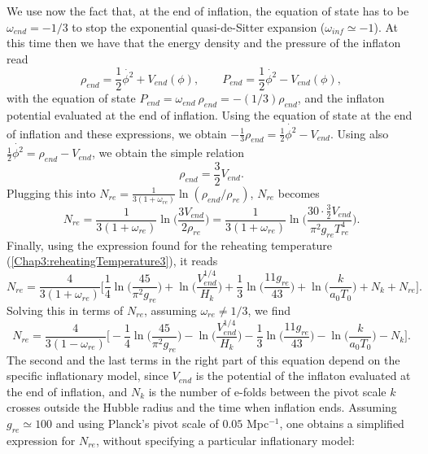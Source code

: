 \documentclass[11pt,a4paper,twoside]{book}
\begin{document}
We use now the fact that, at the end of inflation, the equation of state has to be $ \omega_{end}=-1/3 $ to stop the exponential quasi-de-Sitter expansion ($\omega_{inf} \simeq -1$). At this time then we have that the energy density and the pressure of the inflaton read
\begin{equation}
	\rho_{end} = \frac{1}{2}\dot{\phi^{2}} + V_{end}(\phi),
	\qquad
	P_{end}=  \frac{1}{2}\dot{\phi^{2}} - V_{end}(\phi),
\end{equation}
with the equation of state $ P_{end}=\omega_{end}\ \rho_{end}=-(1/3)\rho_{end} $, and the inflaton potential evaluated at the end of inflation. Using the equation of state at the end of inflation and  these expressions, we obtain 
$ -\frac{1}{3}\rho_{end}= \frac{1}{2}\dot{\phi^{2}}-V_{end} $. Using also $ \frac{1}{2}\dot{\phi^{2}}=\rho_{end}-V_{end} $, we obtain the simple relation 
\begin{equation}
	\label{Chap3:energyDensityPressure}
	\rho_{end}=\frac{3}{2}V_{end}.
\end{equation}
Plugging this into $ N_{re}=\frac{1}{3(1+\omega_{re})}\ln(\rho_{end}/\rho_{re})$, $ N_{re} $ becomes
\begin{equation}
\label{Chap3:Nre2}
N_{re}=\dfrac{1}{3(1+\omega_{re})}\ln \Bigg(\frac{3 V_{end}}{2\rho_{re}} \Bigg) = \dfrac{1}{3(1+\omega_{re})}\ln \Bigg( \frac{30 \cdot \frac{3}{2} V_{end}}{\pi^{2}g_{re}T^{4}_{re}}\Bigg).
\end{equation}
Finally, using the expression found for the reheating temperature (\ref{Chap3:reheatingTemperature3}), it reads
\begin{equation}
\label{Nre3}
N_{re}=\frac{4}{3(1+\omega_{re})}\Bigg[  \frac{1}{4} \ln \Bigg(\frac{45}{\pi^{2} g_{re}}\Bigg)   + \ln \Bigg(\frac{V_{end}^{1/4}}{H_{k}}\Bigg) +  \frac{1}{3}\ln \Bigg(\frac{11 g_{re}}{43}\Bigg) + \ln \Bigg(\frac{k}{a_{0}T_{0}}\Bigg) + N_{k} + N_{re}    \Bigg].
\end{equation}
Solving this in terms of $ N_{re} $, assuming $ \omega_{re} \ne 1/3 $, we find
\begin{equation}
	\label{Chap3:Nre3}
	N_{re}=\frac{4}{3(1-\omega_{re})}\Bigg[ - \frac{1}{4} \ln \Bigg(\frac{45}{\pi^{2} g_{re}}\Bigg)   - \ln \Bigg(\frac{V_{end}^{1/4}}{H_{k}}\Bigg) -  \frac{1}{3}\ln \Bigg(\frac{11 g_{re}}{43}\Bigg) - \ln \Bigg(\frac{k}{a_{0}T_{0}}\Bigg) - N_{k}     \Bigg].
\end{equation}
The second and the last terms in the right part of this equation depend on the specific inflationary model, since $ V_{end} $ is the potential of the inflaton evaluated at the end of inflation, and $ N_{k} $ is the number of e-folds between the pivot scale $ k $ crosses outside the Hubble radius and the time when inflation ends. Assuming $ g_{re} \simeq 100 $ and using Planck's pivot scale of $ 0.05 $ Mpc$^{-1}$, one obtains a simplified expression for $ N_{re} $, without specifying a particular inflationary model:
\end{document}
